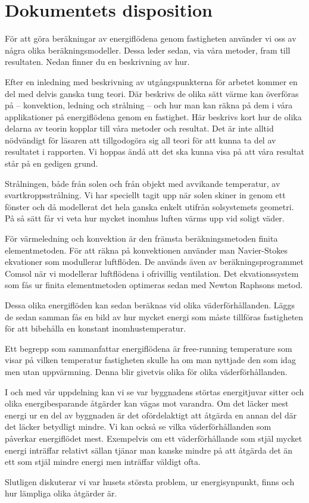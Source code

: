 \section{Dokumentets disposition}

För att göra beräkningar av energiflödena genom fastigheten använder vi oss av några olika beräkningsmodeller. Dessa leder sedan, via våra metoder, fram till resultaten. Nedan finner du en beskrivning av hur.

Efter en inledning med beskrivning av utgångspunkterna för arbetet kommer en del med
 delvis ganska tung teori. Där beskrivs de olika sätt värme kan överföras på – konvektion,
  ledning och strålning – och hur man kan räkna på dem i våra applikationer på 
  energiflödena genom en fastighet. Här beskrivs kort hur de olika delarna av teorin 
  kopplar till våra metoder och resultat. Det är inte alltid nödvändigt för läsaren att 
  tillgodogöra sig all teori för att kunna ta del av resultatet i rapporten. Vi hoppas ändå att 
  det ska kunna visa på att våra resultat står på en gedigen grund.

Strålningen, både från solen och från objekt med avvikande temperatur, av 
svartkroppsstrålning. Vi har speciellt tagit upp när solen skiner in genom ett fönster och då 
modellerat det hela ganska enkelt utifrån solsystemets geometri. På så sätt får vi veta hur 
mycket inomhus luften värms upp vid soligt väder.

För värmeledning och konvektion är den främsta beräkningsmetoden finita 
elementmetoden. För att räkna på konvektionen använder man Navier-Stokes ekvationer 
som modullerar luftflöden. De används även av beräkningsprogrammet Comsol när vi 
modellerar luftflödena i ofrivillig ventilation. Det ekvationssystem som fås ur finita
 elementmetoden optimeras sedan med Newton Raphsons metod.

Dessa olika energiflöden kan sedan beräknas vid olika väderförhållanden. Läggs de 
sedan samman fås en bild av hur mycket energi som måste tillföras fastigheten för att 
bibehålla en konstant inomhustemperatur.

Ett begrepp som sammanfattar energiflödena är free-running temperature som visar på 
vilken temperatur fastigheten skulle ha om man nyttjade den som idag men utan 
uppvärmning. Denna blir givetvis olika för olika väderförhållanden.

I och med vår uppdelning kan vi se var byggnadens störtas energitjuvar sitter och 
olika energibesparande åtgärder kan vägas mot varandra. Om det läcker mest energi ur
 en del av byggnaden är det ofördelaktigt att åtgärda en annan del där det läcker betydligt
  mindre. Vi kan också se vilka väderförhållanden som påverkar energiflödet mest. 
Exempelvis om ett väderförhållande som stjäl mycket energi inträffar relativt sällan tjänar
 man kanske mindre på att åtgärda det än ett som stjäl mindre energi men inträffar väldigt 
 ofta.

Slutligen diskuterar vi var husets största problem, ur energisynpunkt, finns och hur lämpliga olika åtgärder är.

